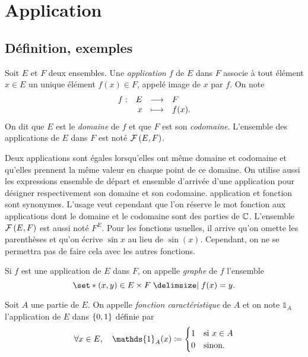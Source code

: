 \documentclass{magnolia}
\begin{document}
\section{Application}

\subsection{Définition, exemples}
\begin{definition}[utile=-3]
Soit $E$ et $F$ deux ensembles. Une \emph{application} $f$ de $E$ dans $F$ associe
à tout élément $x\in E$ un unique élément $f(x)\in F$, appelé image de $x$ par
$f$. On note
\[\begin{array}[t]{lrcl} \displaystyle{f} : & \displaystyle{E} & \longrightarrow & \displaystyle{F} \\ & \displaystyle{x} & \longmapsto & \displaystyle{f(x).} \end{array}\]
On dit que $E$ est le \emph{domaine} de $f$ et que $F$ est son \emph{codomaine}. L'ensemble des
applications de $E$ dans $F$ est noté $\mathcal{F}\left(E,F\right)$.
\end{definition}


\begin{remarques}
\remarque Deux applications sont égales lorsqu'elles ont même domaine et codomaine et qu'elles prennent la
  même valeur en chaque point de ce domaine.
\remarque On utilise aussi les expressions \og ensemble de départ \fg et \og ensemble d'arrivée \fg
  d'une application pour désigner respectivement son domaine et son codomaine.
\remarque \og application \fg et \og fonction \fg sont synonymes. L'usage veut cependant que l'on
  réserve le mot \og fonction \fg aux applications dont le domaine et le codomaine sont des parties de $\mathbb{C}$.
\remarque L'ensemble $\mathcal{F}\left(E,F\right)$ est aussi noté $F^E$.
\remarque Pour les fonctions usuelles, il arrive qu'on omette les parenthèses et
  qu'on écrive $\sin x$ au lieu de $\sin(x)$. Cependant, on ne se permettra pas de faire cela avec les
  autres fonctions.
\end{remarques}

\begin{definition}[utile=-3]
  Si $f$ est une application de $E$ dans $F$, on appelle \emph{graphe} de $f$ l'ensemble
  \[\enstq{\p{x,y}\in E\times F}{f(x)=y}.\]
  \end{definition}
  

\begin{definition}
Soit $A$ une partie de $E$. On appelle \emph{fonction caractéristique} de $A$ et on note $\mathds{1}_A$ l'application de $E$ dans $\left\{0,1\right\}$ définie
par
  \[\forall x\in E \qsep \mathds{1}_A(x)\defeq
    \begin{cases}
    1 & \text{si $x\in A$}\\
    0 & \text{sinon.}
    \end{cases}\]
\end{definition}
\end{document}
